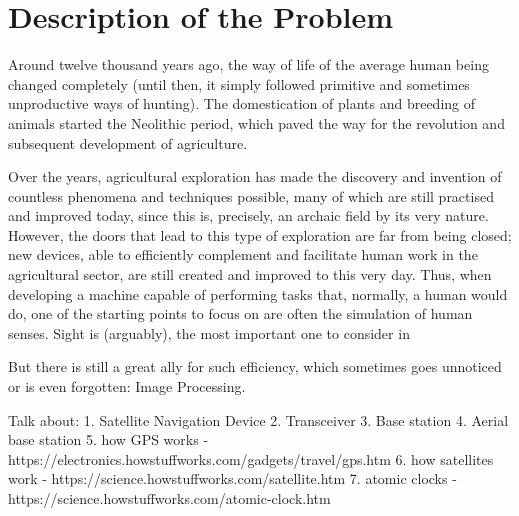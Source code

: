 




\chapter{Description of the Problem}\label{cha:introduction_description}

Around twelve thousand years ago, the way of life of the average human being changed completely (until then, it simply followed primitive and sometimes unproductive ways of hunting). The domestication of plants and breeding of animals started the Neolithic period, which paved the way for the revolution and subsequent development of agriculture. %

Over the years, agricultural exploration has made the discovery and invention of countless phenomena and techniques possible, many of which are still practised and improved today, since this is, precisely, an archaic field by its very nature.
However, the doors that lead to this type of exploration are far from being closed; new devices, able to efficiently complement and facilitate human work in the agricultural sector, are still created and improved to this very day. Thus, when developing a machine capable of performing tasks that, normally, a human would do, one of the starting points to focus on are often the simulation of human senses. Sight is (arguably), the most important one to consider in 

But there is still a great ally for such efficiency, which sometimes goes unnoticed or is even forgotten: Image Processing.



Talk about:
    1. Satellite Navigation Device
    2. Transceiver
    3. Base station
    4. Aerial base station
    5. how GPS works - https://electronics.howstuffworks.com/gadgets/travel/gps.htm
    6. how satellites work - https://science.howstuffworks.com/satellite.htm
    7. atomic clocks - https://science.howstuffworks.com/atomic-clock.htm

